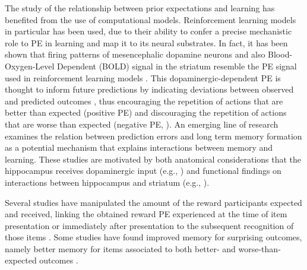 \documentclass[a4paper,12pt]{article}
\begin{document}
The study of the relationship between prior expectations and learning has benefited from the use of computational models. Reinforcement learning models in particular has been used, due to their ability to confer a precise mechanistic role to PE in learning and map it to its neural substrates. In fact, it has been shown that firing patterns of mesencephalic dopamine neurons and also Blood-Oxygen-Level Dependent (BOLD) signal in the striatum resemble the PE signal used in reinforcement learning models \citep{Daw2011, McClure2003, Schultz1997}. This dopaminergic-dependent PE is thought to inform future predictions by indicating deviations between observed and predicted outcomes \citep{Daw2013, Niv2008, Rangel2008a, Rushworth2008}, thus encouraging the repetition of actions that are better than expected (positive PE) and discouraging the repetition of actions that are worse than expected (negative PE, \citealp{Schultz2016, Steinberg2013}). An emerging line of research examines the relation between prediction errors and long term memory formation as a potential mechanism that explains interactions between memory and learning. These studies are motivated by both anatomical considerations that the hippocampus receives dopaminergic input (e.g., \citealp{Lisman2005}) and functional findings on interactions between hippocampus and striatum (e.g., \citealp{Poldrack2001}). \par
Several studies have manipulated the amount of the reward participants expected and received, linking the obtained reward PE experienced at the time of item presentation or immediately after presentation to the subsequent recognition of those items \citep{Rouhani2018,Rouhani2021, Jang2019, de2018signed}. Some studies have found improved memory for surprising outcomes, namely better memory for items associated to both better- and worse-than-expected outcomes \citep{Rouhani2018, Rouhani2021}.
\end{document}
